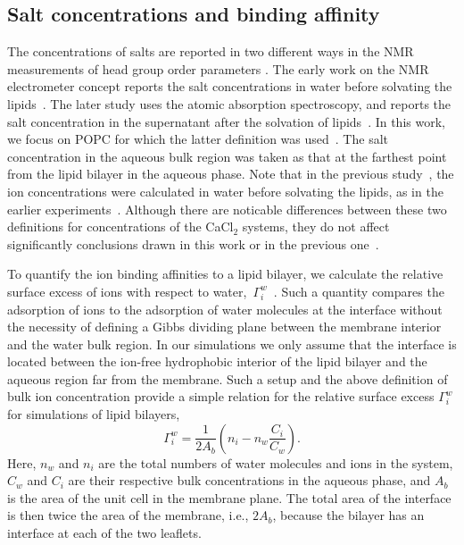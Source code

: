 \documentclass[aip,jcp,twocolumn]{revtex4}
\begin{document}
\subsection{Salt concentrations and binding affinity}
The concentrations of salts are reported in two different ways
in the NMR measurements of head group order parameters \cite{akutsu81, altenbach84}.
The early work on the NMR electrometer concept 
reports the salt concentrations in water before solvating
the lipids~\cite{akutsu81}. 
The later study uses the atomic absorption
spectroscopy, and reports the salt concentration in the supernatant after the
solvation of lipids~\cite{altenbach84}.
In this work, we focus on POPC for which the latter definition was used~\cite{altenbach84}.
The salt concentration in the aqueous bulk region was taken as that at 
the farthest point from the lipid bilayer in the aqueous phase. 
Note that in the previous study~\cite{catte16},
the ion concentrations were calculated in water before solvating the lipids, 
as in the earlier experiments~\cite{akutsu81}.
Although there are noticable differences between these two
definitions for concentrations of the CaCl$_2$ systems,
they do not affect significantly conclusions drawn in this work or in the previous one~\cite{catte16}.

To quantify the ion binding affinities to a lipid bilayer, we
calculate the relative surface excess of ions with respect to water,~$\Gamma_i^w$~\cite{chattorajBOOK}.
Such a quantity compares the adsorption of ions to the adsorption of water molecules 
at the interface without the necessity of defining a Gibbs dividing plane 
between the membrane interior and the water bulk region. 
In our simulations we only assume that the interface is located between the ion-free hydrophobic interior
of the lipid bilayer and the aqueous region far from the membrane.
Such a setup and the above definition of bulk ion concentration provide a simple relation for the relative surface excess $\Gamma_i^w$ for simulations of lipid bilayers, 
\begin{equation}\label{surfexcess}
  \Gamma_i^w=\frac{1}{2A_b} \left ( n_i - n_w \frac{C_i}{C_w} \right ) .
\end{equation}
Here, $n_w$ and $n_i$ are the total numbers of water molecules and ions in the system,
$C_w$ and $C_i$ are their respective bulk concentrations in the aqueous phase,
and $A_b$ is the area of the unit cell in the membrane plane.
The total area of the interface is then twice the area of the membrane, i.e., $2A_b$,
because the bilayer has an interface at each of the two leaflets.
\end{document}
